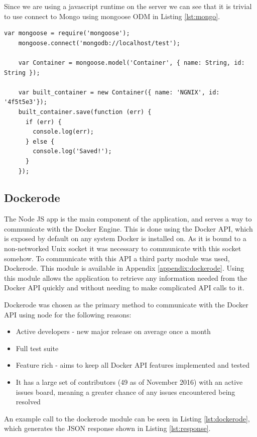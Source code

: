 Since we are using a javascript runtime on the server we can see that it is trivial to use connect to Mongo using mongoose ODM in Listing \ref{lst:mongo}.

\begin{lstlisting}[caption={Communicating with Mongo},label={lst:mongo}]
	var mongoose = require('mongoose');
	mongoose.connect('mongodb://localhost/test');

	var Container = mongoose.model('Container', { name: String, id: String });

	var built_container = new Container({ name: 'NGNIX', id: '4f5t5e3'});
	built_container.save(function (err) {
	  if (err) {
	    console.log(err);
	  } else {
	    console.log('Saved!');
	  }
	});
\end{lstlisting}

\subsection{Dockerode}
\label{sub:dockerode}

The Node JS app is the main component of the application, and serves a way to communicate with the Docker Engine. This is done using the Docker API, which is exposed by default on any system Docker is installed on. As it is bound to a non-networked Unix socket it was necessary to communicate with this socket somehow. To communicate with this API a third party module was used, Dockerode. This module is available in Appendix \ref{appendix:dockerode}. Using this module allows the application to retrieve any information needed from the Docker API quickly and without needing to make complicated API calls to it. 

Dockerode was chosen as the primary method to communicate with the Docker API using node for the following reasons:

\begin{itemize}
	\item Active developers - new major release on average once a month
	\item Full test suite
	\item Feature rich - aims to keep all Docker API features implemented and tested
	\item It has a large set of contributors (49 as of November 2016) with an active issues board, meaning a greater chance of any issues encountered being resolved
\end{itemize}

An example call to the dockerode module can be seen in Listing \ref{lst:dockerode}, which generates the JSON response shown in Listing \ref{lst:response}.

